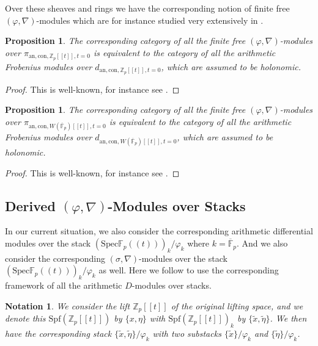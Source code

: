 \documentclass[11pt]{book}
\newtheorem{proposition}[theorem]{Proposition}
\newtheorem{notation}[theorem]{Notation}
\theoremstyle{definition}
\numberwithin{equation}{section}
\begin{document}
\indent Over these sheaves and rings we have the corresponding notion of finite free $(\varphi,\nabla)$-modules which are for instance studied very extensively in \cite{Ked8}.


\begin{proposition} \label{proposition4.7}
The corresponding category of all the finite free $(\varphi,\nabla)$-modules over $\pi_{\mathrm{an},\mathrm{con},{\mathbb{Z}}_p[[t]],t=0}$ is equivalent to the category of all the arithmetic Frobenius modules over $d_{\mathrm{an},\mathrm{con},{\mathbb{Z}}_p[[t]],t=0}$, which are assumed to be holonomic.
\end{proposition}

\begin{proof}
This is well-known, for instance see \cite[Proposition in Section 2.1.4]{AM}.	
\end{proof}



\begin{proposition} \label{proposition4.8}
The corresponding category of all the finite free $(\varphi,\nabla)$-modules over $\pi_{\mathrm{an},\mathrm{con},W(\overline{\mathbb{F}}_p)[[t]],t=0}$ is equivalent to the category of all the arithmetic Frobenius modules over $d_{\mathrm{an},\mathrm{con},W(\overline{\mathbb{F}}_p)[[t]],t=0}$, which are assumed to be holonomic.
\end{proposition}

\begin{proof}
This is well-known, for instance see \cite[Proposition in Section 2.1.4]{AM}.	
\end{proof}

\newpage
\subsection{Derived $(\varphi,\nabla)$-Modules over Stacks} 


\indent In our current situation, we also consider the corresponding arithmetic differential modules over the stack $(\mathrm{Spec}\mathbb{F}_p((t)))_k/\varphi_k$ where $k=\overline{\mathbb{F}}_p$. And we also consider the corresponding $(\sigma,\nabla)$-modules over the stack $(\mathrm{Spec}\mathbb{F}_p((t)))_k/\varphi_k$ as well. Here we follow \cite{Abe} to use the corresponding framework of all the arithmetic $D$-modules over stacks.



\begin{notation}
We consider the lift $\mathbb{Z}_p[[t]]$ of the original lifting space, and we denote this $\mathrm{Spf}(\mathbb{Z}_p[[t]])$ by $\{x,\eta\}$ with $\mathrm{Spf}(\mathbb{Z}_p[[t]])_k$ by $\{\widetilde{x},\widetilde{\eta}\}$. We then have the corresponding stack $\{\widetilde{x},\widetilde{\eta}\}/\varphi_k$ with two substacks $\{\widetilde{x}\}/\varphi_k$ and $\{\widetilde{\eta}\}/\varphi_k$.	
\end{notation}
\end{document}
